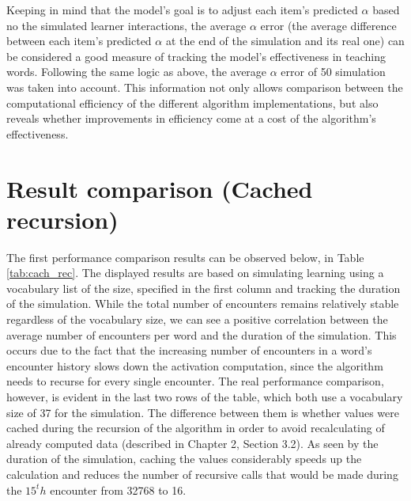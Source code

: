 \documentclass[a4paper]{report}
\begin{document}
Keeping in mind that the model's goal is to adjust each item's predicted $\alpha$ based no the simulated learner interactions, the average $\alpha$ error (the average difference between each item's predicted $\alpha$ at the end of the simulation and its real one) can be considered a good measure of tracking the model's effectiveness in teaching words. Following the same logic as above, the average $\alpha$ error of 50 simulation was taken into account. This information not only allows comparison between the computational efficiency of the different algorithm implementations, but also reveals whether improvements in efficiency come at a cost of the algorithm's effectiveness.

\section{Result comparison (Cached recursion)}
The first performance comparison results can be observed below, in Table \ref{tab:cach_rec}. The displayed results are based on simulating learning using a vocabulary list of the size, specified in the first column and tracking the duration of the simulation. While the total number of encounters remains relatively stable regardless of the vocabulary size, we can see a positive correlation between the average number of encounters per word and the duration of the simulation. This occurs due to the fact that the increasing number of encounters in a word's encounter history slows down the activation computation, since the algorithm needs to recurse for every single encounter. The real performance comparison, however, is evident in the last two rows of the table, which both use a vocabulary size of 37 for the simulation. The difference between them is whether values were cached during the recursion of the algorithm in order to avoid recalculating of already computed data (described in Chapter 2, Section 3.2). As seen by the duration of the simulation, caching the values considerably speeds up the calculation and reduces the number of recursive calls that would be made during the $15^th$ encounter from 32768 to 16.

\begin{table}[h]
	\centering\small
	\caption{Cached Recursion Test Results}
	\label{tab:cach_rec}
\end{table}
\end{document}
